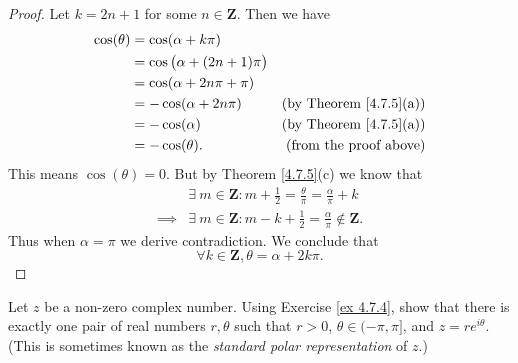 \begin{proof}
    Let \(k = 2n + 1\) for some \(n \in \mathbf{Z}\).
    Then we have
    \begin{align*}
        \cos(\theta) & = \cos(\alpha + k \pi)                                                     \\
                     & = \cos\big(\alpha + (2n + 1) \pi\big)                                      \\
                     & = \cos(\alpha + 2 n \pi + \pi)                                             \\
                     & = -\cos(\alpha + 2 n \pi)             & \text{(by Theorem \ref{4.7.5}(a))} \\
                     & = -\cos(\alpha)                       & \text{(by Theorem \ref{4.7.5}(a))} \\
                     & = -\cos(\theta).                      & \text{(from the proof above)}
    \end{align*}
    This means \(\cos(\theta) = 0\).
    But by Theorem \ref{4.7.5}(c) we know that
    \begin{align*}
                 & \exists\ m \in \mathbf{Z} : m + \frac{1}{2} = \frac{\theta}{\pi} = \frac{\alpha}{\pi} + k \\
        \implies & \exists\ m \in \mathbf{Z} : m - k + \frac{1}{2} = \frac{\alpha}{\pi} \notin \mathbf{Z}.
    \end{align*}
    Thus when \(\alpha = \pi\) we derive contradiction.
    We conclude that
    \[
        \forall k \in \mathbf{Z}, \theta = \alpha + 2 k \pi.
    \]
\end{proof}

\begin{exercise}\label{ex 4.7.6}
    Let \(z\) be a non-zero complex number.
    Using Exercise \ref{ex 4.7.4}, show that there is exactly one pair of real numbers \(r, \theta\) such that \(r > 0\), \(\theta \in (-\pi, \pi]\), and \(z = r e^{i \theta}\).
    (This is sometimes known as the \emph{standard polar representation} of \(z\).)
\end{exercise}


